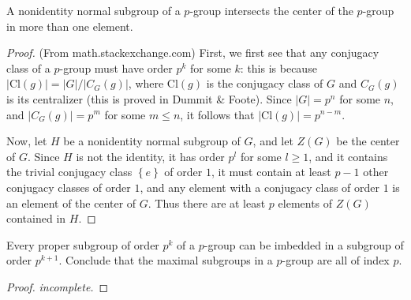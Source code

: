 \documentclass[12pt]{article}
\theoremstyle{definition}
\newenvironment{problem}[2][Problem]{\begin{trivlist}
\item[\hskip \labelsep {\bfseries #1}\hskip \labelsep {\bfseries #2.}]}{\end{trivlist}}
\begin{document}
\begin{problem}{17}
A nonidentity normal subgroup of a $p$-group intersects the center of the $p$-group in more than one element.
\begin{proof}
	(From math.stackexchange.com) First, we first see that any conjugacy class of a $p$-group must have order $p^k$ for some $k$: this is because $\left \lvert { \text{Cl}(g) } \right \lvert = \left \lvert { G } \right \lvert / \left \lvert { C_G(g) } \right \lvert $, where $\text{Cl}(g)$ is the conjugacy class of $G$ and $C_G(g)$ is its centralizer (this is proved in Dummit \& Foote). Since $\left \lvert { G } \right \lvert = p^n$ for some $n$, and $\left \lvert { C_G(g) } \right \lvert = p^m$ for some $m \leq n$, it follows that $\left \lvert { \text{Cl}(g) } \right \lvert  = p^{n-m}$.
	\par Now, let $H$ be a nonidentity normal subgroup of $G$, and let $Z(G)$ be the center of $G$. Since $H$ is not the identity, it has order $p^l$ for some $l \geq 1$, and it contains the trivial conjugacy class $\left\{ e \right\}$ of order $1$, it must contain at least $p-1$ other conjugacy classes of order $1$, and any element with a conjugacy class of order $1$ is an element of the center of $G$. Thus there are at least $p$ elements of $Z(G)$ contained in $H$.
\end{proof}
\end{problem}
\begin{problem}{18}
Every proper subgroup of order $p^k$ of a $p$-group can be imbedded in a subgroup of order $p^{k+1}$. Conclude that the maximal subgroups in a $p$-group are all of index $p$.
\begin{proof}
	\textit{incomplete.}
\end{proof}
\end{problem}
\end{document}
